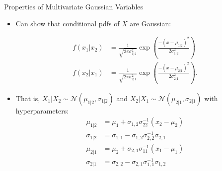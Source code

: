 \documentclass[9pt]{beamer}
\begin{document}
%
\begin{frame}{Properties of Multivariate Gaussian Variables}

\begin{itemize}

\item Can show that conditional pdfs of $X$ are Gaussian:
\begin{block}{}
\begin{align*}
f(x_1|x_2)&=\frac{1}{\sqrt{2\pi\sigma_{1|2}^2}}\exp \left({\frac{-(x-\mu_{1|2})^2}{2\sigma_{1|2}^2}}\right)\\
f(x_2|x_1)&=\frac{1}{\sqrt{2\pi\sigma_{2|1}^2}}\exp \left({\frac{-(x-\mu_{2|1})^2}{2\sigma_{2|1}^2}}\right).
\end{align*} 
\end{block}
\item That is, $X_1|X_2\sim \mathcal{N}(\mu_{1|2},\sigma_{1|2})$ and $X_2|X_1\sim \mathcal{N}(\mu_{2|1},\sigma_{2|1})$ with hyperparameters:
\begin{align*}
\mu_{1|2}&=\mu_1+\sigma_{1,2}\sigma_{22}^{-1}(x_2-\mu_2)\\
\sigma_{1|2}&=\sigma_{1,1}-\sigma_{1,2}\sigma_{2,2}^{-1}\sigma_{2,1}\\
\mu_{2|1}&=\mu_2+\sigma_{2,1}\sigma_{11}^{-1}(x_1-\mu_1)\\
\sigma_{2|1}&=\sigma_{2,2}-\sigma_{2,1}\sigma_{1,1}^{-1}\sigma_{1,2}
\end{align*}
\end{itemize}

\end{frame}
\end{document}
